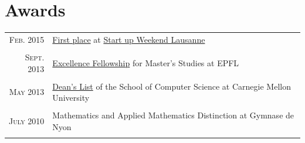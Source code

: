 \documentclass[a4paper,11pt]{article} %
\begin{document}

\section{Awards}

\begin{tabular}{rl}

\textsc{Feb.} 2015 & 
\href{http://tasti.ch}{First place} at
\href{http://lausanne.startupweekend.org/}{Start up Weekend Lausanne}\\
\\
\textsc{Sept.} 2013 & 
\href{http://master.epfl.ch/excellence-fellowships}{Excellence Fellowship} 
for Master's Studies at EPFL\\
\\
\textsc{May} 2013 & 
\href{http://coursecatalog.web.cmu.edu/schoolofcomputerscience/#schoolofcomputersciencescsacademicstandardsandactions}{Dean's
List} of the School of Computer Science at Carnegie Mellon University\\
\\
\textsc{July} 2010 & 
Mathematics and Applied Mathematics Distinction at Gymnase de Nyon\\
\\
\end{tabular}

\end{document}
